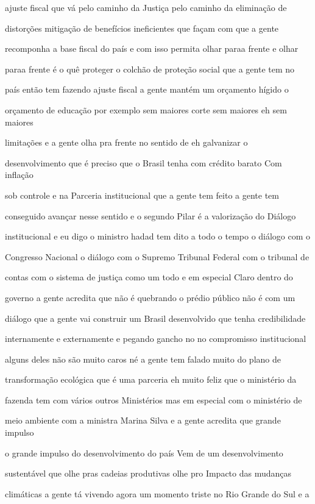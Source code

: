 \documentclass[a4paper,12pt]{article}
\begin{document}
ajuste fiscal que vá pelo caminho da Justiça pelo caminho da eliminação de

distorções mitigação de benefícios ineficientes que façam com que a gente

recomponha a base fiscal do país e com isso permita olhar paraa frente e olhar

paraa frente é o quê proteger o colchão de proteção social que a gente tem no

país então tem fazendo ajuste fiscal a gente mantém um orçamento hígido o

orçamento de educação por exemplo sem maiores corte sem maiores eh sem maiores

limitações e a gente olha pra frente no sentido de eh galvanizar o

desenvolvimento que é preciso que o Brasil tenha com crédito barato Com inflação

sob controle e na Parceria institucional que a gente tem feito a gente tem

conseguido avançar nesse sentido e o segundo Pilar é a valorização do Diálogo

institucional e eu digo o ministro hadad tem dito a todo o tempo o diálogo com o

Congresso Nacional o diálogo com o Supremo Tribunal Federal com o tribunal de

contas com o sistema de justiça como um todo e em especial Claro dentro do

governo a gente acredita que não é quebrando o prédio público não é com um

diálogo que a gente vai construir um Brasil desenvolvido que tenha credibilidade

internamente e externamente e pegando gancho no no compromisso institucional

alguns deles não são muito caros né a gente tem falado muito do plano de

transformação ecológica que é uma parceria eh muito feliz que o ministério da

fazenda tem com vários outros Ministérios mas em especial com o ministério de

meio ambiente com a ministra Marina Silva e a gente acredita que grande impulso

o grande impulso do desenvolvimento do país Vem de um desenvolvimento

sustentável que olhe pras cadeias produtivas olhe pro Impacto das mudanças

climáticas a gente tá vivendo agora um momento triste no Rio Grande do Sul e a
\end{document}
